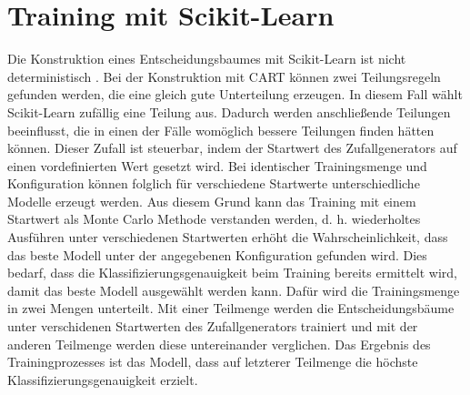 \section{Training mit Scikit-Learn}
Die Konstruktion eines Entscheidungsbaumes mit Scikit-Learn ist nicht deterministisch \cite{dymelThesis}.
Bei der Konstruktion mit CART können zwei Teilungsregeln gefunden werden, die eine gleich gute Unterteilung erzeugen.
In diesem Fall wählt Scikit-Learn zufällig eine Teilung aus.
Dadurch werden anschließende Teilungen beeinflusst, die in einen der Fälle womöglich bessere Teilungen finden hätten können.
Dieser Zufall ist steuerbar, indem der Startwert des Zufallgenerators auf einen vordefinierten Wert gesetzt wird.
\newline
\newline
Bei identischer Trainingsmenge und Konfiguration können folglich für verschiedene Startwerte unterschiedliche Modelle erzeugt werden.
Aus diesem Grund kann das Training mit einem Startwert als Monte Carlo Methode verstanden werden, d. h. wiederholtes Ausführen unter verschiedenen Startwerten erhöht die Wahrscheinlichkeit, dass das
beste Modell unter der angegebenen Konfiguration gefunden wird.
\newline
\newline
Dies bedarf, dass die Klassifizierungsgenauigkeit beim Training bereits ermittelt wird, damit das beste Modell ausgewählt werden kann.
Dafür wird die Trainingsmenge in zwei Mengen unterteilt. Mit einer Teilmenge werden die Entscheidungsbäume unter verschidenen Startwerten des Zufallgenerators trainiert und
mit der anderen Teilmenge werden diese untereinander verglichen. Das Ergebnis des Trainingprozesses ist das Modell, dass auf letzterer Teilmenge die höchste
Klassifizierungsgenauigkeit erzielt.